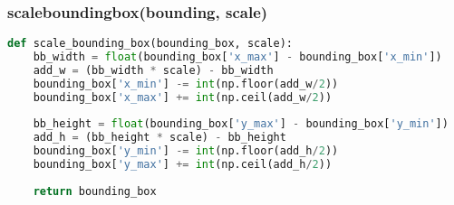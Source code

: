 \subsubsection{scale{\textunderscore}bounding{\textunderscore}box(bounding{\textunderscore}, scale)}

\begin{lstlisting}[frame=single,language=python]
def scale_bounding_box(bounding_box, scale):
	bb_width = float(bounding_box['x_max'] - bounding_box['x_min'])
	add_w = (bb_width * scale) - bb_width
	bounding_box['x_min'] -= int(np.floor(add_w/2))
	bounding_box['x_max'] += int(np.ceil(add_w/2))
	
	bb_height = float(bounding_box['y_max'] - bounding_box['y_min'])
	add_h = (bb_height * scale) - bb_height
	bounding_box['y_min'] -= int(np.floor(add_h/2))
	bounding_box['y_max'] += int(np.ceil(add_h/2))
	
	return bounding_box
\end{lstlisting}